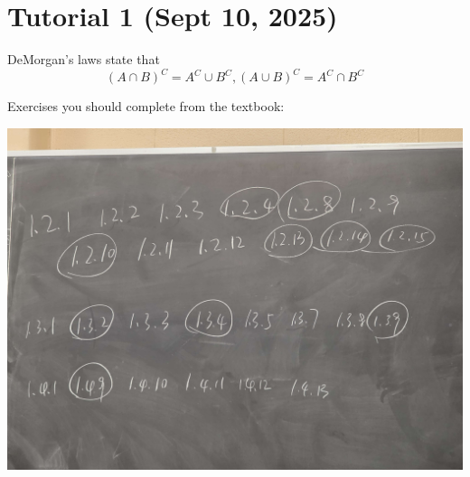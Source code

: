\section{Tutorial 1 (Sept 10, 2025)}
DeMorgan's laws state that
\[
(A \cap B)^C = A^C \cup B^C, (A \cup B)^C = A^C \cap B^C
\]

Exercises you should complete from the textbook:

\includegraphics{sta257/figures/tut1problems.jpg}

